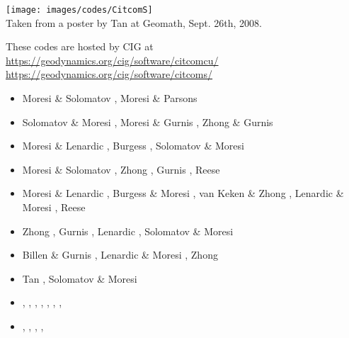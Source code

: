 \begin{itemize}
\begin{center}
\texttt{[image: images/codes/CitcomS]}\\
{\captionfont Taken from a poster by Tan \etal at Geomath, Sept. 26th, 2008.}
\end{center}

These codes are hosted by CIG at\\
\url{https://geodynamics.org/cig/software/citcomcu/}  \\
\url{https://geodynamics.org/cig/software/citcoms/}

\begin{scriptsize}
\begin{itemize}
\item[\nineteenninetyfive] Moresi \& Solomatov \cite{moso95}, Moresi \& Parsons \cite{mopa95}
\item[\nineteenninetysix] Solomatov \& Moresi \cite{somo96}, Moresi \& Gurnis \cite{mogu96}, 
                    Zhong \& Gurnis \cite{zhgu96}
\item[\nineteenninetyseven] Moresi \& Lenardic \cite{mole97}, Burgess \etal \cite{bugm97}, 
                    Solomatov \& Moresi \cite{somo97}
\item[\nineteenninetyeight] Moresi \& Solomatov \cite{moso98}, Zhong \etal \cite{zhgm98}, 
                    Gurnis \etal \cite{gumm98}, Reese \etal \cite{resm98}
\item[\nineteenninetynine] Moresi \& Lenardic \cite{mole99}, Burgess \& Moresi \cite{bumo99}, 
                    van Keken \& Zhong \cite{vazh99}, Lenardic \& Moresi \cite{lemo99}, 
                    Reese \etal \cite{resm99}
\item[\twothousand] Zhong \etal \cite{zhzm00}, Gurnis \etal \cite{gumr00,gumm00},
                    Lenardic \etal \cite{lemm00}, Solomatov \& Moresi \cite{somo00}
\item[\twothousandone] Billen \& Gurnis \cite{bigu01}, Lenardic \& Moresi \cite{lemo01},
                    Zhong \cite{zhon01}
\item[\twothousandtwo] Tan \etal \cite{tagh02}, Solomatov \& Moresi \cite{somo02}
\item[\twothousandthree]     \textcite{vazh03},  \textcite{cogu03},
                             \textcite{bigu03},  \textcite{lemm03},  \textcite{vesh03},
                             \textcite{lemo03},  \textcite{bigs03}, 
\item[\twothousandfour]      \textcite{keso04},  \textcite{solo04},
                             \textcite{frmm04},  \textcite{lenm04},

\end{itemize}
\end{scriptsize}
\end{itemize}
